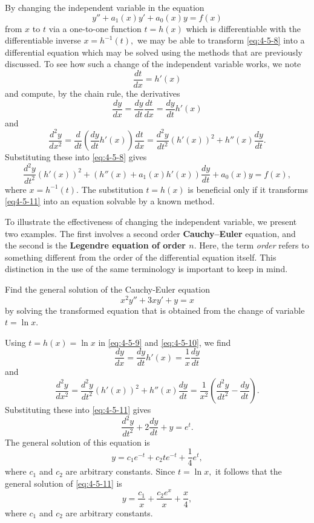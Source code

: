 By changing the independent variable in the  equation 
\begin{equation}\label{eq:4-5-8}
	y''+ a_1(x) y' + a_0(x)y = f(x)
\end{equation}from $x$ to $t$ via a one-to-one function $t= h(x)$ which is differentiable with the differentiable inverse $x= h^{-1}(t),$ we may be able to transform \eqref{eq:4-5-8} into a differential equation which may be solved using the methods that are previously discussed. To see how such a change of the independent variable works, we note
\[\frac{dt}{dx} = h'(x)\]  and compute, by the chain rule, the derivatives
\begin{equation}\label{eq:4-5-9}
	\frac{dy}{dx} = \frac{dy}{dt}\frac{dt}{dx} = \frac{dy}{dt}h'(x)
\end{equation}
and 
\begin{equation}\label{eq:4-5-10}
	\frac{d^2y}{dx^2} = \frac{d}{dt}\left(\frac{dy}{dt}h'(x)\right)\frac{dt}{dx}   =\frac{d^2y}{dt^2} \left(h'(x)\right)^2+ h''(x) \frac{dy}{dt}.
	\end{equation}
Substituting these into \eqref{eq:4-5-8} gives
\begin{equation}\label{eq4-5-11}
	\frac{d^2y}{dt^2} \left(h'(x)\right)^2+ \left(h''(x) +a_1(x) h'(x)\right)\frac{dy}{dt}+ a_0(x)y= f(x),
\end{equation}
 where \(x = h^{-1}(t).\)  
  The substitution $t = h(x)$ is beneficial only if it transforms \eqref{eq4-5-11} into an equation solvable by a known method.
 
 To illustrate the effectiveness of changing the independent variable, we present two examples. The first involves a second order \textbf{Cauchy–Euler} equation, and the second is the \textbf{Legendre equation of order $n.$}
 Here, the term \textit{order} refers to something different from the order of the differential equation itself. This distinction in the use of the same terminology is important to keep in mind.


\begin{example}
	Find the general solution of
the Cauchy-Euler equation
\begin{equation}\label{eq:4-5-11}
	x^2 y''+3xy'+y = x
\end{equation}    by solving the transformed equation that is obtained from  the change of variable $t= \ln x.$
\end{example}
\begin{solution}
	Using $t = h(x) = \ln x$ in \eqref{eq:4-5-9} and \eqref{eq:4-5-10}, we find
	\[\frac{dy}{dx} = \frac{dy}{dt}h'(x) =\frac{1}{x}\frac{dy}{dt}\]
	 and 
	 \[	\frac{d^2y}{dx^2}  =\frac{d^2y}{dt^2} \left(h'(x)\right)^2+ h''(x) \frac{dy}{dt} = \frac{1}{x^2} \left(\frac{d^2y}{dt^2}-\frac{dy}{dt} \right).\]
	 Substituting these into \eqref{eq:4-5-11} gives
	 \[\frac{d^2y}{dt^2}+2\frac{dy}{dt}+  y= e^t.\]
	 The general solution of this equation is
	 \[y= c_1 e^{-t} + c_2 t e^{-t} + \frac{1}{4} e^t,\] where $c_1$ and $c_2$ are arbitrary constants.
	 Since $t=\ln x,$  it follows that the general solution of \eqref{eq:4-5-11} is
	  \[y= \frac{c_1}{x} + \frac{c_2 e^x}{x} + \frac{x}{4},\]
	  where $c_1$ and $c_2$ are arbitrary constants.
\end{solution}

